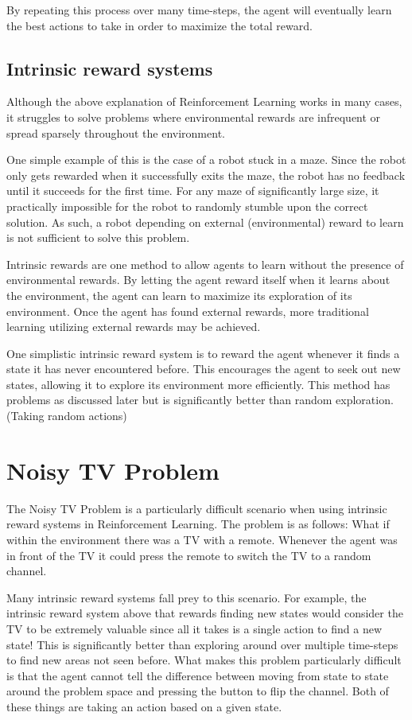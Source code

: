 \documentclass[12pt]{thesis}
\begin{document}
By repeating this process over many time-steps, the agent will eventually learn the best actions to take in order to maximize the total reward.

\subsection{Intrinsic reward systems}
Although the above explanation of Reinforcement Learning works in many cases, it struggles to solve problems where environmental rewards are infrequent or spread sparsely throughout the environment.

One simple example of this is the case of a robot stuck in a maze. Since the robot only gets rewarded when it successfully exits the maze, the robot has no feedback until it succeeds for the first time. For any maze of significantly large size, it practically impossible for the robot to randomly stumble upon the correct solution. As such, a robot depending on external (environmental) reward to learn is not sufficient to solve this problem.

Intrinsic rewards are one method to allow agents to learn without the presence of environmental rewards. By letting the agent reward itself when it learns about the environment, the agent can learn to maximize its exploration of its environment. Once the agent has found external rewards, more traditional learning utilizing external rewards may be achieved.

One simplistic intrinsic reward system is to reward the agent whenever it finds a state it has never encountered before. This encourages the agent to seek out new states, allowing it to explore its environment more efficiently. This method has problems as discussed later but is significantly better than random exploration. (Taking random actions)

\section{Noisy TV Problem}
The Noisy TV Problem is a particularly difficult scenario when using intrinsic reward systems in Reinforcement Learning. The problem is as follows: What if within the environment there was a TV with a remote. Whenever the agent was in front of the TV it could press the remote to switch the TV to a random channel.

Many intrinsic reward systems fall prey to this scenario. For example, the intrinsic reward system above that rewards finding new states would consider the TV to be extremely valuable since all it takes is a single action to find a new state! This is significantly better than exploring around over multiple time-steps to find new areas not seen before. What makes this problem particularly difficult is that the agent cannot tell the difference between moving from state to state around the problem space and pressing the button to flip the channel. Both of these things are taking an action based on a given state.
\end{document}
